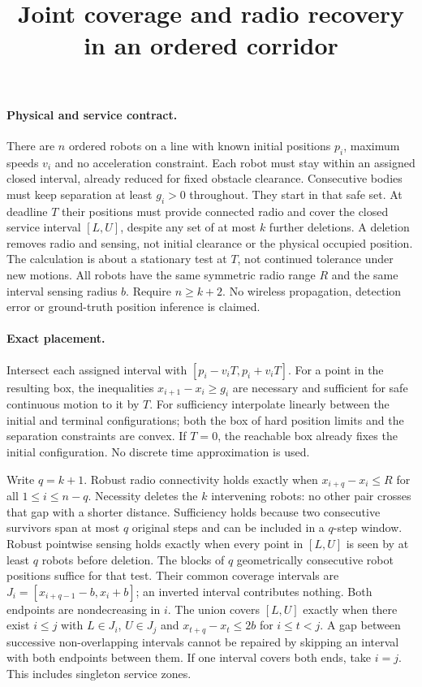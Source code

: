 \documentclass{article}
\title{Joint coverage and radio recovery in an ordered corridor}
\date{}
\begin{document}
\maketitle

\paragraph{Physical and service contract.}
There are $n$ ordered robots on a line with known initial positions
$p_i$, maximum speeds $v_i$ and no acceleration constraint. Each
robot must stay within an assigned closed interval, already reduced
for fixed obstacle clearance. Consecutive bodies must keep separation
at least $g_i>0$ throughout. They start in that safe set.
At deadline $T$ their positions must provide connected radio and cover
the closed service interval $[L,U]$, despite any set of at most $k$
further deletions. A deletion removes radio and sensing, not initial
clearance or the physical occupied position. The calculation is about
a stationary test at $T$, not continued tolerance under new motions.
All robots have the same symmetric radio range $R$ and the same
interval sensing radius $b$. Require $n\ge k+2$. No wireless
propagation, detection error or ground-truth position inference is
claimed.

\paragraph{Exact placement.}
Intersect each assigned interval with $[p_i-v_iT,p_i+v_iT]$.
For a point in the resulting box, the inequalities
$x_{i+1}-x_i\ge g_i$ are necessary and sufficient for safe continuous
motion to it by $T$. For sufficiency interpolate linearly between
the initial and terminal configurations; both the box of hard
position limits and the separation constraints are convex. If $T=0$,
the reachable box already fixes the initial configuration.
No discrete time approximation is used.

Write $q=k+1$. Robust radio connectivity holds exactly when
$x_{i+q}-x_i\le R$ for all $1\le i\le n-q$. Necessity deletes the
$k$ intervening robots: no other pair crosses that gap with a shorter
distance. Sufficiency holds because two consecutive survivors span
at most $q$ original steps and can be included in a $q$-step window.
Robust pointwise sensing holds exactly when every point in $[L,U]$
is seen by at least $q$ robots before deletion. The blocks of
$q$ geometrically consecutive robot positions suffice for that test.
Their common coverage intervals are
$J_i=[x_{i+q-1}-b,x_i+b]$; an inverted interval contributes nothing.
Both endpoints are nondecreasing in $i$. The union covers $[L,U]$
exactly when there exist $i\le j$ with $L\in J_i$, $U\in J_j$ and
$x_{t+q}-x_t\le 2b$ for $i\le t<j$. A gap between successive
non-overlapping intervals cannot be repaired by skipping an interval
with both endpoints between them. If one interval covers both ends,
take $i=j$. This includes singleton service zones.
\end{document}
